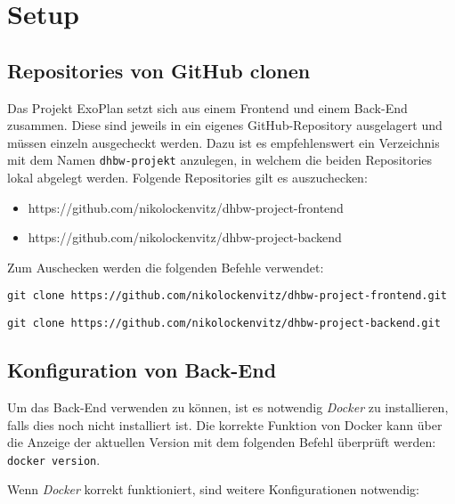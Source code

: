 \section{Setup}
\subsection{Repositories von GitHub clonen}

Das Projekt ExoPlan setzt sich aus einem Frontend und einem Back-End zusammen. 
Diese sind jeweils in ein eigenes GitHub-Repository ausgelagert und müssen einzeln ausgecheckt werden. 
Dazu ist es empfehlenswert ein Verzeichnis mit dem Namen \texttt{dhbw-projekt} anzulegen, in welchem die beiden Repositories lokal abgelegt werden. 
Folgende Repositories gilt es auszuchecken:
\begin{itemize}
	\item https://github.com/nikolockenvitz/dhbw-project-frontend
	\item https://github.com/nikolockenvitz/dhbw-project-backend
\end{itemize}

Zum Auschecken werden die folgenden Befehle verwendet:

\texttt{git clone https://github.com/nikolockenvitz/dhbw-project-frontend.git}

\texttt{git clone https://github.com/nikolockenvitz/dhbw-project-backend.git}

\subsection{Konfiguration von Back-End}

Um das Back-End verwenden zu können, ist es notwendig \textit{Docker} zu installieren, falls dies noch nicht installiert ist. 
Die korrekte Funktion von Docker kann über die Anzeige der aktuellen Version mit dem folgenden Befehl überprüft werden: \texttt{docker version}.

Wenn \textit{Docker} korrekt funktioniert, sind weitere Konfigurationen notwendig:

